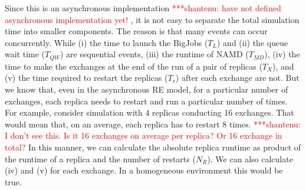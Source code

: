 \documentclass{rspublic}
\newcommand{\jhanote}[1]{ {\textcolor{red} { ***shantenu: #1 }}}
\newcommand{\jhanote}[1]{}
\begin{document}


Since this is an asynchronous implementation\jhanote{have not defined
  asynchronous implementation yet!}  , it is not easy to separate the
total simulation time into smaller components. The reason is that many
events can occur
concurrently. %
While (i) the time to launch the BigJobs ($T_{L}$) and (ii) the queue
wait time ($T_{QW}$) are sequential events, (iii) the runtime of NAMD
($T_{MD}$), (iv) the time to make the exchanges at the end of the run
of a pair of replicas ($T_{X}$), and (v) the time required to restart
the replicas ($T_{r}$) after each exchange are not. But we know that,
even in the asynchronous RE model, for a particular number of
exchanges, each replica needs to restart and run a particular number
of times. For example, consider simulation with 4 replicas conducting
16 exchanges. That would mean that, on an average, each replica has to
restart 8 times. \jhanote{I don't see this. Is it 16 exchanges on
  average per replica? Or 16 exchange in total?} In this manner, we
can calculate the absolute replica runtime as product of the runtime
of a replica and the number of restarts ($N_{R}$). We can also
calculate (iv) and (v) for each exchange. In a homogeneous environment
this would be true.


\end{document}

